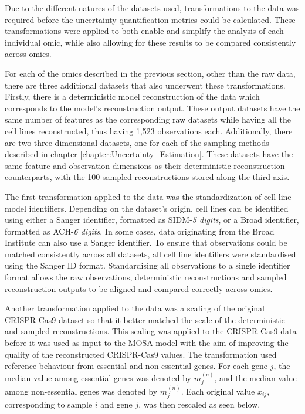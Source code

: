 Due to the different natures of the datasets used, transformations to the data was required before the uncertainty quantification metrics could be calculated. These transformations were applied to both enable and simplify the analysis of each individual omic, while also allowing for these results to be compared consistently across omics. 

For each of the omics described in the previous section, other than the raw data, there are three additional datasets that also underwent these transformations. Firstly, there is a deterministic model reconstruction of the data which corresponds to the model's reconstruction output. These output datasets have the same number of features as the corresponding raw datasets while having all the cell lines reconstructed, thus having 1,523 observations each. Additionally, there are two three-dimensional datasets, one for each of the sampling methods described in chapter \ref{chapter:Uncertainty_Estimation}. These datasets have the same feature and observation dimensions as their deterministic reconstruction counterparts, with the 100 sampled reconstructions stored along the third axis. 

The first transformation applied to the data was the standardization of cell line model identifiers. Depending on the dataset's origin, cell lines can be identified using either a Sanger identifier, formatted as SIDM-\textit{5 digits}, or a Broad identifier, formatted as ACH-\textit{6 digits}. In some cases, data originating from the Broad Institute can also use a Sanger identifier. To ensure that observations could be matched consistently across all datasets, all cell line identifiers were standardised using the Sanger ID format. Standardising all observations to a single identifier format allows the raw observations, deterministic reconstructions and sampled reconstruction outputs to be aligned and compared correctly across omics.

Another transformation applied to the data was a scaling of the original CRISPR-Cas9 dataset so that it better matched the scale of the deterministic and sampled reconstructions. This scaling was applied to the CRISPR-Cas9 data before it was used as input to the \gls{MOSA} model with the aim of improving the quality of the reconstructed CRISPR-Cas9 values. The transformation used reference behaviour from essential and non-essential genes. For each gene $j$, the median value among essential genes was denoted by $m^{(e)}_j$, and the median value among non-essential genes was denoted by $m^{(n)}_j$. Each original value $x_{ij}$, corresponding to sample $i$ and gene $j$, was then rescaled as seen below.

